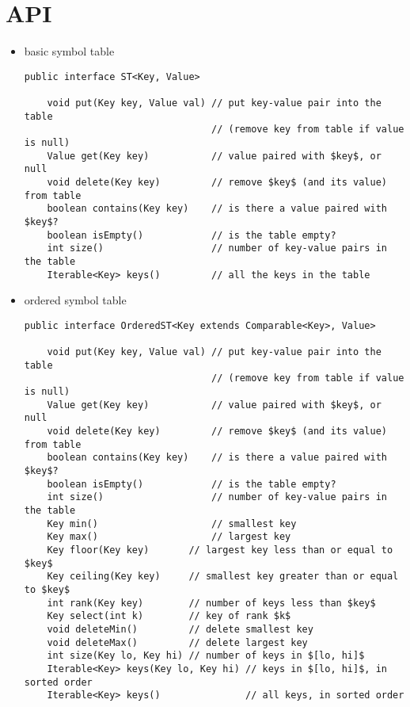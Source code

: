 \documentclass[8pt,a4paper,compress]{beamer}
\begin{document}
\section{API}
\begin{frame}[fragile]
\begin{itemize}
\item basic symbol table
\begin{lstlisting}[language={},mathescape]
public interface ST<Key, Value>

    void put(Key key, Value val) // put key-value pair into the table
                                 // (remove key from table if value is null)
    Value get(Key key)           // value paired with $key$, or null
    void delete(Key key)         // remove $key$ (and its value) from table
    boolean contains(Key key)    // is there a value paired with $key$?
    boolean isEmpty()            // is the table empty?
    int size()                   // number of key-value pairs in the table
    Iterable<Key> keys()         // all the keys in the table
\end{lstlisting}
\end{itemize}
\end{frame}

\begin{frame}[fragile]
\begin{itemize}
\item ordered symbol table
\begin{lstlisting}[language={},mathescape]
public interface OrderedST<Key extends Comparable<Key>, Value>

    void put(Key key, Value val) // put key-value pair into the table
                                 // (remove key from table if value is null)
    Value get(Key key)           // value paired with $key$, or null
    void delete(Key key)         // remove $key$ (and its value) from table
    boolean contains(Key key)    // is there a value paired with $key$?
    boolean isEmpty()            // is the table empty?
    int size()                   // number of key-value pairs in the table
    Key min()                    // smallest key
    Key max()                    // largest key
    Key floor(Key key)       // largest key less than or equal to $key$
    Key ceiling(Key key)     // smallest key greater than or equal to $key$
    int rank(Key key)        // number of keys less than $key$
    Key select(int k)        // key of rank $k$
    void deleteMin()         // delete smallest key
    void deleteMax()         // delete largest key
    int size(Key lo, Key hi) // number of keys in $[lo, hi]$
    Iterable<Key> keys(Key lo, Key hi) // keys in $[lo, hi]$, in sorted order
    Iterable<Key> keys()               // all keys, in sorted order    
\end{lstlisting}
\end{itemize}
\end{frame}
\end{document}
